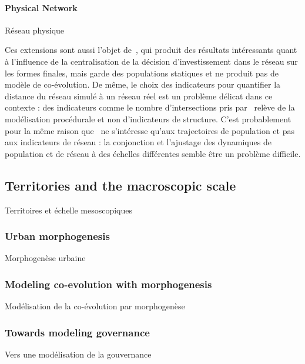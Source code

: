 \paragraph{Physical Network}{Réseau physique}



Ces extensions sont aussi l'objet de~\cite{mimeur:tel-01451164}, qui produit des résultats intéressants quant à l'influence de la centralisation de la décision d'investissement dans le réseau sur les formes finales, mais garde des populations statiques et ne produit pas de modèle de co-évolution. De même, le choix des indicateurs pour quantifier la distance du réseau simulé à un réseau réel est un problème délicat dans ce contexte : des indicateurs comme le nombre d'intersections pris par~\cite{mimeur:tel-01451164} relève de la modélisation procédurale et non d'indicateurs de structure. C'est probablement pour la même raison que~\cite{schmitt2014modelisation} ne s'intéresse qu'aux trajectoires de population et pas aux indicateurs de réseau : la conjonction et l'ajustage des dynamiques de population et de réseau à des échelles différentes semble être un problème difficile.





\subsection{Territories and the macroscopic scale}{Territoires et échelle mesoscopiques}


\subsubsection{Urban morphogenesis}{Morphogenèse urbaine}




\subsubsection{Modeling co-evolution with morphogenesis}{Modélisation de la co-évolution par morphogenèse}





\subsubsection{Towards modeling governance}{Vers une modélisation de la gouvernance}

